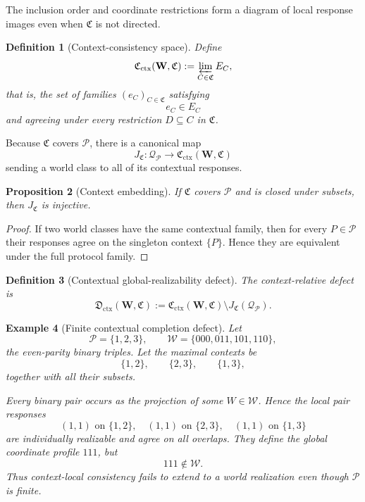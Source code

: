 \documentclass[11pt]{article}
\newtheorem{definition}{Definition}[section]
\newtheorem{proposition}[definition]{Proposition}
\newtheorem{example}[definition]{Example}
\newcommand{\W}{\mathcal W}
\newcommand{\Pcal}{\mathcal P}
\begin{document}
The inclusion order and coordinate restrictions form a diagram of local
response images even when $\mathfrak C$ is not directed.

\begin{definition}[Context-consistency space]
Define
\[
\mathfrak C_{\mathrm{ctx}}(\mathbf W,\mathfrak C)
:=
\varprojlim_{C\in\mathfrak C}E_C,
\]
that is, the set of families $(e_C)_{C\in\mathfrak C}$ satisfying
\[
e_C\in E_C
\]
and agreeing under every restriction $D\subseteq C$ in $\mathfrak C$.
\end{definition}

Because $\mathfrak C$ covers $\Pcal$, there is a canonical map
\[
J_{\mathfrak C}:\mathcal Q_{\Pcal}
\longrightarrow
\mathfrak C_{\mathrm{ctx}}(\mathbf W,\mathfrak C)
\]
sending a world class to all of its contextual responses.

\begin{proposition}[Context embedding]
If $\mathfrak C$ covers $\Pcal$ and is closed under subsets, then
$J_{\mathfrak C}$ is injective.
\end{proposition}

\begin{proof}
If two world classes have the same contextual family, then for every
$P\in\Pcal$ their responses agree on the singleton context $\{P\}$.
Hence they are equivalent under the full protocol family.
\end{proof}

\begin{definition}[Contextual global-realizability defect]
The context-relative defect is
\[
\mathfrak D_{\mathrm{ctx}}(\mathbf W,\mathfrak C)
:=
\mathfrak C_{\mathrm{ctx}}(\mathbf W,\mathfrak C)
\setminus
J_{\mathfrak C}(\mathcal Q_{\Pcal}).
\]
\end{definition}

\begin{example}[Finite contextual completion defect]
Let
\[
\Pcal=\{1,2,3\},
\qquad
\W=\{000,011,101,110\},
\]
the even-parity binary triples. Let the maximal contexts be
\[
\{1,2\},\qquad \{2,3\},\qquad \{1,3\},
\]
together with all their subsets.

Every binary pair occurs as the projection of some $W\in\W$. Hence the local
pair responses
\[
(1,1)\text{ on }\{1,2\},\quad
(1,1)\text{ on }\{2,3\},\quad
(1,1)\text{ on }\{1,3\}
\]
are individually realizable and agree on all overlaps. They define the global
coordinate profile $111$, but
\[
111\notin\W.
\]
Thus context-local consistency fails to extend to a world realization even
though $\Pcal$ is finite.
\end{example}
\end{document}
